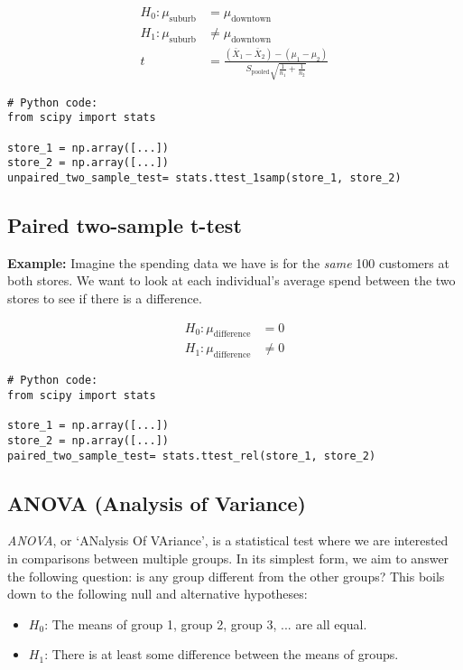 \documentclass{article}
\theoremstyle{definition}
\theoremstyle{theorem}
\theoremstyle{theorem}
\theoremstyle{theorem}
\theoremstyle{theorem}
\theoremstyle{definition}
\theoremstyle{definition}
\theoremstyle{definition}
\theoremstyle{definition}
\theoremstyle{definition}
\begin{document}
\begin{align*}
    H_0: \mu_{\text{suburb}} &= \mu_{\text{downtown}} \\
    H_1: \mu_{\text{suburb}} &\neq \mu_{\text{downtown}} \\
    t &= \frac{(\bar{X}_1 - \bar{X}_2) - (\mu_1 - \mu_2)}{S_{\text{pooled}} \sqrt{\frac{1}{n_1} + \frac{1}{n_2}}}
\end{align*}

\lstset{language=Python}
\begin{lstlisting}
# Python code:
from scipy import stats

store_1 = np.array([...])
store_2 = np.array([...])
unpaired_two_sample_test= stats.ttest_1samp(store_1, store_2)
\end{lstlisting}

\subsection{Paired two-sample t-test}

\textbf{Example:} Imagine the spending data we have is for the \textit{same} 100 customers at both stores. We want to look at each individual's average spend between the two stores to see if there is a difference.

\begin{align*}
    H_0: \mu_{\text{difference}} &= 0 \\
    H_1: \mu_{\text{difference}} &\neq 0
\end{align*}

\lstset{language=Python}
\begin{lstlisting}
# Python code:
from scipy import stats

store_1 = np.array([...])
store_2 = np.array([...])
paired_two_sample_test= stats.ttest_rel(store_1, store_2)
\end{lstlisting}

\subsection{ANOVA (Analysis of Variance)}

\textit{ANOVA}, or `ANalysis Of VAriance', is a statistical test where we are interested in comparisons between multiple groups. In its simplest form, we aim to answer the following question: is any group different from the other groups? This boils down to the following null and alternative hypotheses:

\begin{itemize}
    \item {$H_0$}: The means of group 1, group 2, group 3, ... are all equal.
    \item {$H_1$}: There is at least some difference between the means of groups.
\end{itemize}
\end{document}
